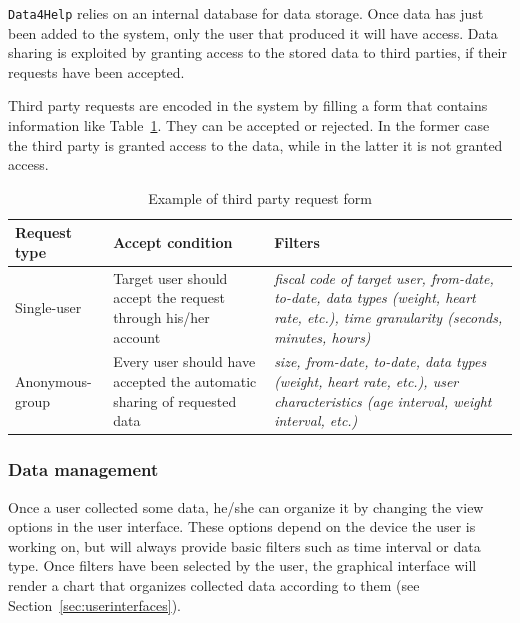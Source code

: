 \documentclass[12pt]{article}
\begin{document}
      \texttt{Data4Help} relies on an internal database for data storage. Once data has just been added to the system, only the user that produced it will have access. Data sharing is exploited by granting access to the stored data to third parties, if their requests have been accepted.

      Third party requests are encoded in the system by filling a form that contains information like Table~\ref{tab:tprequest}. They can be accepted or rejected. In the former case the third party is granted access to the data, while in the latter it is not granted access.

      \begin{table}[h!]
        \centering
        \begin{tabularx}{\linewidth}{|l|X|X|}
          \hline
          \textbf{Request type} & \textbf{Accept condition}                                               & \textbf{Filters}                                                                                                                           \\ \hline
          Single-user           & Target user should accept the request through his/her account                                   & \textit{fiscal code of target user, from-date, to-date, data types (weight, heart rate, etc.), time granularity (seconds, minutes, hours)} \\ \hline
          Anonymous-group       & Every user should have accepted the automatic sharing of requested data & \textit{size, from-date, to-date, data types (weight, heart rate, etc.), user characteristics (age interval, weight interval, etc.)}       \\ \hline
        \end{tabularx}
        \caption{Example of third party request form}
        \label{tab:tprequest}
      \end{table}

    \subsubsection{Data management}

      Once a user collected some data, he/she can organize it by changing the view options in the user interface. These options depend on the device the user is working on, but will always provide basic filters such as time interval or data type. Once filters have been selected by the user, the graphical interface will render a chart that organizes collected data according to them (see Section~\ref{sec:userinterfaces}).
\end{document}
